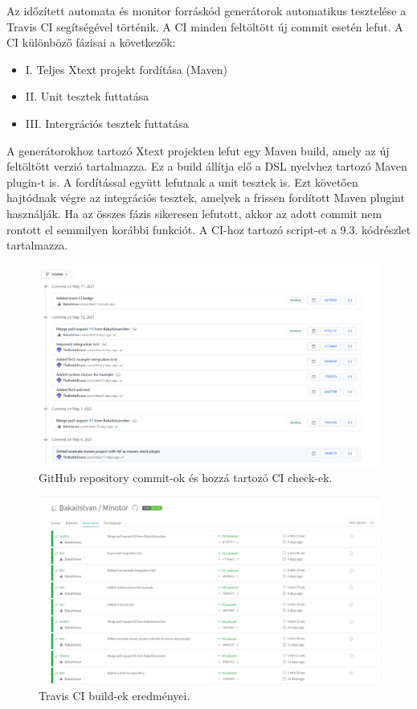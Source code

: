 Az időzített automata és monitor forráskód generátorok automatikus tesztelése a Travis CI segítségével történik.
A CI minden feltöltött új commit esetén lefut.
A CI különböző fázisai a következők:

\begin{itemize}
    \item I. Teljes Xtext projekt fordítása (Maven)
    \item II. Unit tesztek futtatása
    \item III. Intergrációs tesztek futtatása
\end{itemize}

A generátorokhoz tartozó Xtext projekten lefut egy Maven build, amely az új feltöltött verzió tartalmazza.
Ez a build állítja elő a DSL nyelvhez tartozó Maven plugin-t is.
A fordítással együtt lefutnak a unit tesztek is.
Ezt követően hajtódnak végre az integrációs tesztek, amelyek a frissen fordított Maven plugint használják.
Ha az összes fázis sikeresen lefutott, akkor az adott commit nem rontott el semmilyen korábbi funkciót.
A CI-hoz tartozó script-et a 9.3. kódrészlet tartalmazza.

\begin{figure}[!ht]
    \centering
    \includegraphics[width=150mm, keepaspectratio]{figures/github_ci_check.png}
    \caption{GitHub repository commit-ok és hozzá tartozó CI check-ek.}
\end{figure}

\begin{figure}[!ht]
    \centering
    \includegraphics[width=150mm, keepaspectratio]{figures/travis_overview.png}
    \caption{Travis CI build-ek eredményei.}
\end{figure}

